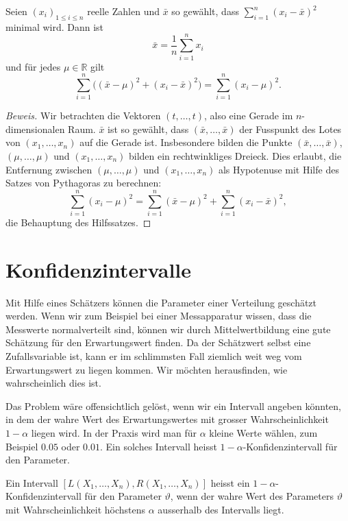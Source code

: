 \begin{hilfssatz}
\label{hilfssatz-varianz-mittelwert}
Seien $(x_i)_{1\le i\le n}$ reelle Zahlen und $\bar x$ so gewählt,
dass $\sum_{i=1}^n(x_i-\bar x)^2$ minimal wird.
Dann ist 
\begin{equation}
\bar x=\frac1n\sum_{i=1}^nx_i
\end{equation}
und für jedes $\mu\in\mathbb{R}$ gilt
\begin{equation}
\sum_{i=1}^n\bigl((\bar x-\mu)^2 + (x_i-\bar x)^2\bigr)
=\sum_{i=1}^n(x_i-\mu)^2.
\end{equation}
\end{hilfssatz}
\begin{proof}[Beweis]
Wir betrachten die Vektoren $(t,\dots,t)$, also eine Gerade im
$n$-dimensionalen Raum.
$\bar x$ ist so gewählt, dass $(\bar x,\dots,\bar x)$
der Fusspunkt des Lotes von $(x_1,\dots,x_n)$ auf die Gerade ist.
Insbesondere bilden die Punkte $(\bar x,\dots,\bar x)$, $(\mu,\dots,\mu)$
und $(x_1,\dots,x_n)$ bilden ein rechtwinkliges Dreieck.
Dies erlaubt,
die Entfernung zwischen $(\mu,\dots,\mu)$ und $(x_1,\dots,x_n)$ 
als Hypotenuse mit Hilfe des Satzes von Pythagoras zu berechnen:
\[
\sum_{i=1}^n(x_i-\mu)^2
=\sum_{i=1}^n(\bar x-\mu)^2+\sum_{i=1}^n(x_i-\bar x)^2,
\]
die Behauptung des Hilfssatzes.
\end{proof}

\section{Konfidenzintervalle} \label{section-konfidenzintervalle}
Mit Hilfe eines Schätzers können die Parameter einer Verteilung
geschätzt werden.
Wenn wir zum Beispiel bei einer Messapparatur
wissen, dass die Messwerte normalverteilt sind, können wir durch
Mittelwertbildung eine gute Schätzung für den Erwartungswert finden.
Da der Schätzwert selbst eine Zufallsvariable ist, kann er
im schlimmsten Fall ziemlich weit weg vom Erwartungswert zu liegen
kommen.
Wir möchten herausfinden, wie wahrscheinlich dies ist.

Das Problem wäre offensichtlich gelöst, wenn wir ein Intervall
angeben könnten, in dem der wahre Wert des Erwartungswertes mit
grosser Wahrscheinlichkeit $1-\alpha$ liegen wird.
In der Praxis
wird man für $\alpha$ kleine Werte wählen, zum Beispiel $0.05$ oder $0.01$.
Ein solches Intervall heisst $1-\alpha$-Konfidenzintervall für den
Parameter.

\begin{definition}
Ein Intervall $[L(X_1,\dots,X_n),R(X_1,\dots,X_n)]$
heisst ein $1-\alpha$-Konfidenzintervall
für den Parameter $\vartheta$, wenn der wahre Wert des Parameters
$\vartheta$ mit Wahrscheinlichkeit höchstens $\alpha$ ausserhalb
des Intervalls liegt.
\end{definition}

